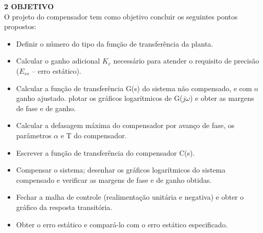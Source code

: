 \noindent \textcolor{myBlue}{\textbf{\large{2 OBJETIVO }}}\\

O projeto do compensador tem como objetivo concluir os seguintes pontos propostos:

\begin{itemize}
\item Definir o número do tipo da função de transferência da planta.
\item Calcular o ganho adicional $K_c$ necessário para atender o requisito de precisão ($E_{ss}$ – erro estático).
\item Calcular a função de transferência G(s) do sistema não compensado, e com o ganho ajustado.
plotar os gráficos logarítmicos de G($j\omega$) e obter as margens de fase e de ganho.
\item Calcular a defasagem máxima do compensador por avanço de fase, os parâmetros $\alpha$ e T do compensador.
\item Escrever a função de transferência do compensador C(s).
\item Compensar o sistema; desenhar os gráficos logarítmicos do sistema compensado e verificar as margens de fase e de ganho obtidas.
\item Fechar a malha de controle (realimentação unitária e negativa) e obter o gráfico da resposta transitória.
\item Obter o erro estático e compará-lo com o erro estático especificado. 
\end{itemize} 
